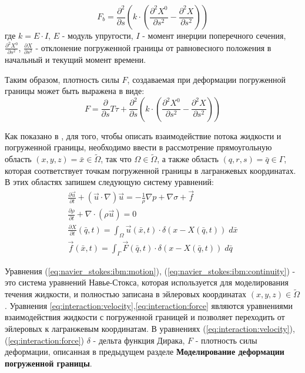\begin{equation}
    F_b = \frac{\partial^2}{\partial s} \left( k \cdot \left(\frac{\partial^2 X^0}{\partial s^2} - \frac{\partial^2 X}{\partial s^2} \right) \right)
\end{equation}
где $k = E \cdot I$, $E$ - модуль упругости, $I$ - момент инерции поперечного
сечения, $\frac{\partial^2 X^0}{\partial s^2}$, $\frac{\partial X}{\partial
    s^2}$ - отклонение погруженной границы от равновесного положения в
начальный и текущий момент времени.

Таким образом, плотность силы $F$, создаваемая при деформации погруженной
границы может быть выражена в виде:
\begin{equation}
    F = \frac{\partial}{\partial s} T \tau + \frac{\partial^2}{\partial s} \left( k \cdot \left(\frac{\partial^2 X^0}{\partial s^2} - \frac{\partial^2 X}{\partial s^2} \right) \right)
\end{equation}

Как показано в \cite{peskin2002immersed}, для того, чтобы описать
взаимодействие потока жидкости и погруженной границы, необходимо ввести в
рассмотрение прямоугольную область $(x, y, z) = \bar{x} \in \tilde{\Omega}$,
так что $\Omega \in \tilde{\Omega}$, а также область $(q, r, s) = \bar{q} \in
\Gamma$, которая соответствует точкам погруженной границы в лагранжевых
координатах.  В этих областях запишем следующую систему уравнений:
\begin{gather}
    \label{eq:navier_stokes:ibm:motion}
    \frac{\partial \vec{u}}{\partial t} + (\vec{u} \cdot \nabla) \vec{u} = - \frac{1}{\rho} \nabla p + \nabla \sigma + \vec{f}\\
    \label{eq:navier_stokes:ibm:continuity}
    \frac{\partial \rho}{\partial t} + \nabla \cdot (\rho \vec{u}) = 0\\
    \label{eq:interaction:velocity}
    \frac{\partial X}{\partial t}(\bar{q}, t) = \int_{\Omega} \vec{u}(\bar{x}, t) \cdot \delta (x - X(\bar{q}, t))\; d\bar{x}\\
    \label{eq:interaction:force}
    \vec{f}(\bar{x}, t) = \int_{\Gamma} \vec{F}(\bar{q}, t) \cdot \delta (x - X(\bar{q}, t))\; d\bar{q}
\end{gather}

Уравнения (\ref{eq:navier_stokes:ibm:motion}),
(\ref{eq:navier_stokes:ibm:continuity}) - это система уравнений Навье-Стокса,
которая используется для моделирования течения жидкости, и полностью записана в
эйлеровых координатах $(x, y, z) \in \tilde{\Omega}$.  Уравнения
\ref{eq:interaction:velocity},\ref{eq:interaction:force} являются уравнениями
взаимодействия жидкости с погруженной границей и позволяет переходить от
эйлеровых к лагранжевым координатам. В уравнениях
(\ref{eq:interaction:velocity}), (\ref{eq:interaction:force}) $\delta$ - дельта
функция Дирака, $F$ - плотность силы деформации, описанная в предыдущем разделе
\textbf{Моделирование деформации погруженной границы}.

